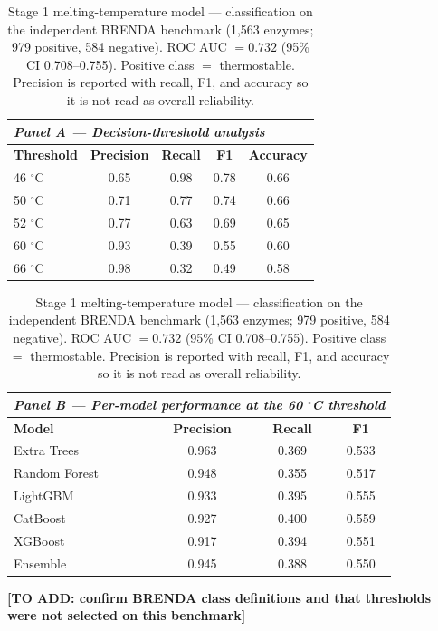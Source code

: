 \documentclass[11pt]{article}
\newcommand{\filler}[1]{\colorbox{filleryellow}{\bfseries [TO ADD: #1]}}
\newcommand{\degC}{\ensuremath{^{\circ}}C}
\begin{document}
\begin{table}[htbp]
\centering
\caption{Stage 1 melting-temperature model --- classification on the independent BRENDA
benchmark (1{,}563 enzymes; 979 positive, 584 negative). ROC AUC $=0.732$ (95\% CI 0.708--0.755).
Positive class $=$ thermostable. Precision is reported with recall, F1, and accuracy so it is not
read as overall reliability.}
\label{tab:stage1}
\small
\begin{tabular}{lcccc}
\toprule
\multicolumn{5}{l}{\textit{Panel A --- Decision-threshold analysis}}\\
\midrule
\textbf{Threshold} & \textbf{Precision} & \textbf{Recall} & \textbf{F1} & \textbf{Accuracy}\\
\midrule
46 \degC & 0.65 & 0.98 & 0.78 & 0.66\\
50 \degC & 0.71 & 0.77 & 0.74 & 0.66\\
52 \degC & 0.77 & 0.63 & 0.69 & 0.65\\
60 \degC & 0.93 & 0.39 & 0.55 & 0.60\\
66 \degC & 0.98 & 0.32 & 0.49 & 0.58\\
\bottomrule
\end{tabular}

\vspace{6pt}
\begin{tabular}{lccc}
\toprule
\multicolumn{4}{l}{\textit{Panel B --- Per-model performance at the 60 \degC{} threshold}}\\
\midrule
\textbf{Model} & \textbf{Precision} & \textbf{Recall} & \textbf{F1}\\
\midrule
Extra Trees   & 0.963 & 0.369 & 0.533\\
Random Forest & 0.948 & 0.355 & 0.517\\
LightGBM      & 0.933 & 0.395 & 0.555\\
CatBoost      & 0.927 & 0.400 & 0.559\\
XGBoost       & 0.917 & 0.394 & 0.551\\
Ensemble      & 0.945 & 0.388 & 0.550\\
\bottomrule
\end{tabular}

\vspace{3pt}
{\footnotesize \filler{confirm BRENDA class definitions and that thresholds were not selected on this benchmark}}
\end{table}
\end{document}
